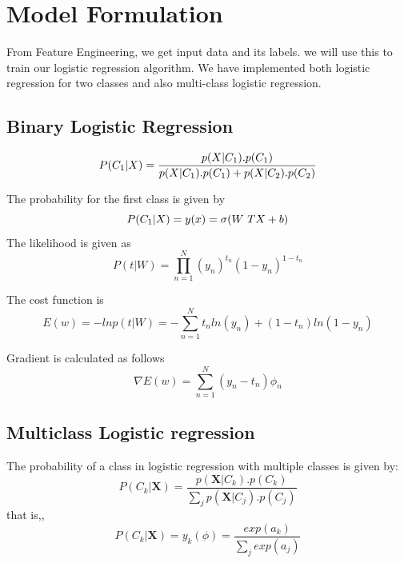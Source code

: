 \documentclass{article}
\begin{document}

\section{Model Formulation}
From Feature Engineering, we get input data and its labels. we will use this to train our logistic regression algorithm. We have implemented both logistic regression for two classes and also multi-class logistic regression.
\subsection{Binary Logistic Regression}


\begin{equation*}
P(C_{1}|X) = \vspace{10mm}   \frac{p(X|C_{1}).p(C_{1})}{p(X|C_{1}).p(C_{1}) + p(X|C_{2}).p(C_{2})}
\end{equation*}



The probability for the first class is given by 
\begin{equation*}
P(C_{1}|X) = y(x)  = \sigma(W\textsuperscript{T}X + b) 
\end{equation*}
The likelihood is given as 
\begin{equation*}
P(t|W) = \prod\limits_{n=1}^N (y_{n})^{t_{n}}(1-y_{n})^{1- t_{n}}
\end{equation*}

The cost function is 
\begin{equation*}
E(w) = -ln  p(t|W) = -\sum\limits_{n=1}^N t_{n}ln(y_{n}) + (1-t_{n})ln(1-y_{n})
\end{equation*}

Gradient is calculated as follows
\begin{equation*}
\nabla E(w) = \sum\limits_{n=1}^N (y_{n} - t_{n}) \phi_{n}
\end{equation*}



\subsection{Multiclass Logistic regression}
The probability of a class in logistic regression with multiple
classes is given by:
\begin{equation*}
P(C_{k}|\boldsymbol{X}) =  \frac{p(\boldsymbol{X}|C_{k}).p(C_{k})}{\sum\limits_{j}p(\boldsymbol{X}|C_{j}).p(C_{j})}
\end{equation*}
that is,,
\begin{equation*}
P(C_{k}|\boldsymbol{X}) =  y_{k}(\phi) = \frac{exp(a_{k})}{\sum\limits_{j} exp(a_{j})}
\end{equation*}
\end{document}
